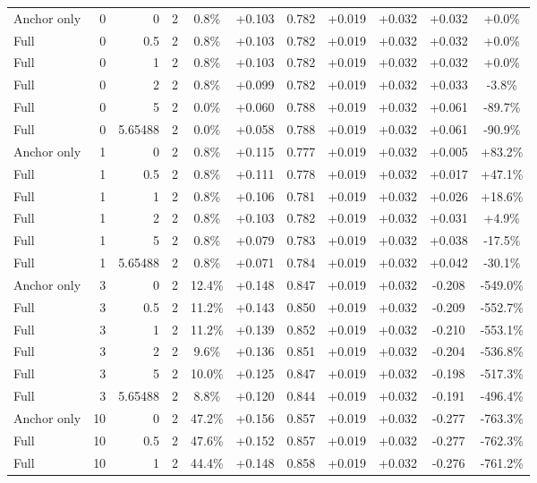 \begin{table}[htbp]
\begin{tabular}{lrrrccccccc}
Anchor only & 0 & 0 & 2 & 0.8\% & +0.103 & 0.782 & +0.019 & +0.032 & +0.032 & +0.0\% \\
Full & 0 & 0.5 & 2 & 0.8\% & +0.103 & 0.782 & +0.019 & +0.032 & +0.032 & +0.0\% \\
Full & 0 & 1 & 2 & 0.8\% & +0.103 & 0.782 & +0.019 & +0.032 & +0.032 & +0.0\% \\
Full & 0 & 2 & 2 & 0.8\% & +0.099 & 0.782 & +0.019 & +0.032 & +0.033 & -3.8\% \\
Full & 0 & 5 & 2 & 0.0\% & +0.060 & 0.788 & +0.019 & +0.032 & +0.061 & -89.7\% \\
Full & 0 & 5.65488 & 2 & 0.0\% & +0.058 & 0.788 & +0.019 & +0.032 & +0.061 & -90.9\% \\
Anchor only & 1 & 0 & 2 & 0.8\% & +0.115 & 0.777 & +0.019 & +0.032 & +0.005 & +83.2\% \\
Full & 1 & 0.5 & 2 & 0.8\% & +0.111 & 0.778 & +0.019 & +0.032 & +0.017 & +47.1\% \\
Full & 1 & 1 & 2 & 0.8\% & +0.106 & 0.781 & +0.019 & +0.032 & +0.026 & +18.6\% \\
Full & 1 & 2 & 2 & 0.8\% & +0.103 & 0.782 & +0.019 & +0.032 & +0.031 & +4.9\% \\
Full & 1 & 5 & 2 & 0.8\% & +0.079 & 0.783 & +0.019 & +0.032 & +0.038 & -17.5\% \\
Full & 1 & 5.65488 & 2 & 0.8\% & +0.071 & 0.784 & +0.019 & +0.032 & +0.042 & -30.1\% \\
Anchor only & 3 & 0 & 2 & 12.4\% & +0.148 & 0.847 & +0.019 & +0.032 & -0.208 & -549.0\% \\
Full & 3 & 0.5 & 2 & 11.2\% & +0.143 & 0.850 & +0.019 & +0.032 & -0.209 & -552.7\% \\
Full & 3 & 1 & 2 & 11.2\% & +0.139 & 0.852 & +0.019 & +0.032 & -0.210 & -553.1\% \\
Full & 3 & 2 & 2 & 9.6\% & +0.136 & 0.851 & +0.019 & +0.032 & -0.204 & -536.8\% \\
Full & 3 & 5 & 2 & 10.0\% & +0.125 & 0.847 & +0.019 & +0.032 & -0.198 & -517.3\% \\
Full & 3 & 5.65488 & 2 & 8.8\% & +0.120 & 0.844 & +0.019 & +0.032 & -0.191 & -496.4\% \\
Anchor only & 10 & 0 & 2 & 47.2\% & +0.156 & 0.857 & +0.019 & +0.032 & -0.277 & -763.3\% \\
Full & 10 & 0.5 & 2 & 47.6\% & +0.152 & 0.857 & +0.019 & +0.032 & -0.277 & -762.3\% \\
Full & 10 & 1 & 2 & 44.4\% & +0.148 & 0.858 & +0.019 & +0.032 & -0.276 & -761.2\% \\

\end{tabular}
\end{table}
